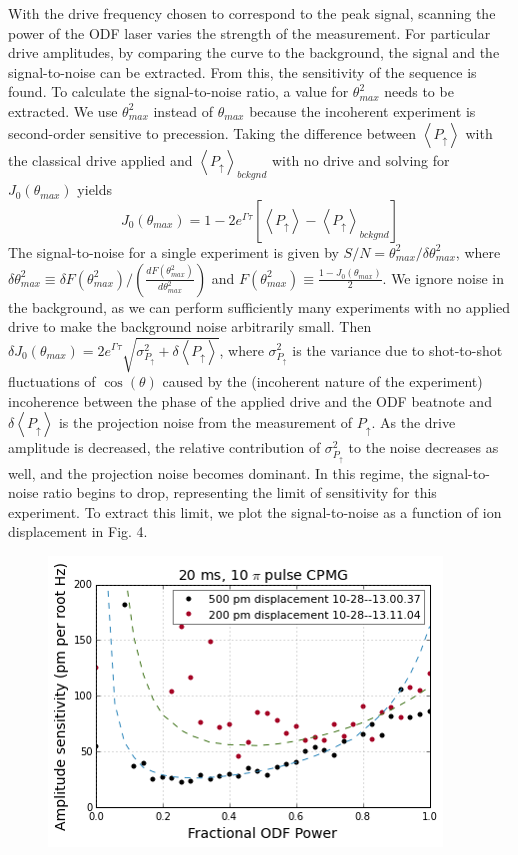 \documentclass[aps,prl,twocolumn,superscriptaddress,floatfix]{revtex4-1}
\begin{document}
With the drive frequency chosen to correspond to the peak signal, scanning the power of the ODF laser varies the strength of the measurement. For particular drive amplitudes, by comparing the curve to the background, the signal and the signal-to-noise can be extracted. From this, the sensitivity of the sequence is found. To calculate the signal-to-noise ratio, a value for $\theta^{2}_{max}$ needs to be extracted. We use $\theta^{2}_{max}$ instead of $\theta_{max}$ because the incoherent experiment is second-order sensitive to precession. Taking the difference between $\left< P_{\uparrow} \right>$ with the classical drive applied and $\left< P_{\uparrow} \right>_{bckgnd}$ with no drive and solving for $J_0(\theta_{max})$ yields
\[J_0(\theta_{max}) = 1 - 2e^{\Gamma \tau} \left[ \left< P_{\uparrow} \right> - \left< P_{\uparrow} \right>_{bckgnd} \right] \]
The signal-to-noise for a single experiment is given by $S/N =\theta_{max}^{2}/\delta \theta_{max}^{2}$, where $\delta \theta_{max}^{2} \equiv \delta F(\theta_{max}^{2})/ \left( \frac{dF(\theta_{max}^{2})}{d\theta_{max}^{2}} \right)$ and  $F(\theta_{max}^{2}) \equiv \frac{1-J_0(\theta_{max})}{2}$. We ignore noise in the background, as we can perform sufficiently many experiments with no applied drive to make the background noise arbitrarily small. Then $\delta J_0(\theta_{max}) = 2e^{\Gamma \tau} \sqrt{\sigma^{2}_{P_{\uparrow}} + \delta \left< P_{\uparrow} \right>}$, where $\sigma^{2}_{P_{\uparrow}}$ is the variance due to shot-to-shot fluctuations of $\cos(\theta)$ caused by the (incoherent nature of the experiment) incoherence between the phase of the applied drive and the ODF beatnote and $\delta \left< P_{\uparrow} \right>$ is the projection noise from the measurement of $P_{\uparrow}$. As the drive amplitude is decreased, the relative contribution of $\sigma^{2}_{P_{\uparrow}}$ to the noise decreases as well, and the projection noise becomes dominant. In this regime, the signal-to-noise ratio begins to drop, representing the limit of sensitivity for this experiment. To extract this limit, we plot the signal-to-noise as a function of ion displacement in Fig. 4. 
\begin{figure}[h]
\includegraphics[width=.25\textwidth]{amp_sense_both}
\caption{}\label{Fig 4}
\end{figure}
\end{document}
